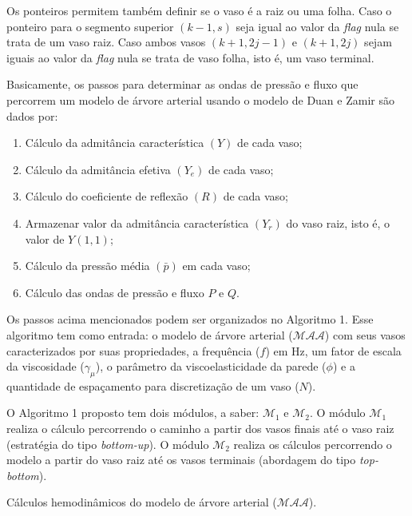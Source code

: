 \documentclass[a4paper,12pt]{monografia}
\theoremstyle{plain}
\theoremstyle{definition}
\theoremstyle{remark}
\begin{document}
Os ponteiros permitem também definir se o vaso é a raiz ou uma folha. Caso o ponteiro para o segmento superior $(k-1,s)$ seja igual ao valor da \textit{flag} nula se trata de um vaso raiz. Caso ambos vasos  $(k+1,2j-1)$ e $(k+1,2j)$ sejam iguais ao valor da \textit{flag} nula se trata de vaso folha, isto é, um vaso terminal.

Basicamente, os passos para determinar as ondas de pressão e fluxo que percorrem um modelo de árvore arterial usando o modelo de Duan e Zamir são dados por:
\begin{enumerate}
	\item Cálculo da admitância característica $(Y)$ de cada vaso;
	\item Cálculo da admitância efetiva $(Y_e)$  de cada vaso;
	\item Cálculo do coeficiente de reflexão $(R)$  de cada vaso; 
	\item Armazenar valor da admitância característica $(Y_r)$ do vaso raiz, isto é, o valor de $Y(1,1)$;
	\item Cálculo da pressão média $(\bar{p})$ em cada vaso;
	\item Cálculo das ondas de pressão e fluxo $P$ e $Q$.
\end{enumerate}

Os passos acima mencionados podem ser organizados no Algoritmo 1. Esse algoritmo tem como entrada: o modelo de árvore arterial ($\mathcal{MAA}$) com seus vasos caracterizados por suas propriedades, a frequência ($f$) em Hz, um fator de escala da viscosidade ($\gamma_{\mu}$), o parâmetro da viscoelasticidade da parede ($\phi$) e a quantidade de espaçamento para discretização de um vaso ($N$).

O Algoritmo 1 proposto tem dois módulos, a saber: $\mathcal{M}_1$ e $\mathcal{M}_2$. O módulo $\mathcal{M}_1$ realiza o cálculo percorrendo o caminho a partir dos vasos finais até o vaso raiz (estratégia do tipo \textit{bottom-up}). O módulo $\mathcal{M}_2$ realiza os cálculos percorrendo o modelo a partir do vaso raiz até os vasos terminais (abordagem do tipo \textit{top-bottom}).

\begin{algorithm}[H]
	\SetAlgoLined
	\caption{Cálculos hemodinâmicos do modelo de árvore arterial ($\mathcal{MAA}$).}
\end{algorithm}
\end{document}
